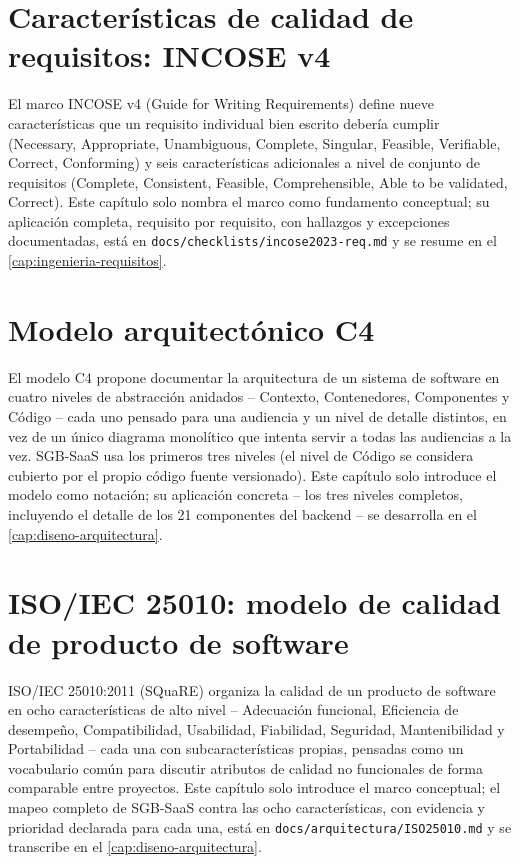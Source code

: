 \section{Características de calidad de requisitos: INCOSE v4}
\label{sec:mt-incose}

El marco INCOSE v4 (Guide for Writing Requirements) define nueve
características que un requisito individual bien escrito debería
cumplir (Necessary, Appropriate, Unambiguous, Complete, Singular,
Feasible, Verifiable, Correct, Conforming) y seis características
adicionales a nivel de conjunto de requisitos (Complete, Consistent,
Feasible, Comprehensible, Able to be validated, Correct). Este capítulo
solo nombra el marco como fundamento conceptual; su aplicación completa,
requisito por requisito, con hallazgos y excepciones documentadas, está
en \texttt{docs/checklists/incose2023-req.md} y se resume en el
\autoref{cap:ingenieria-requisitos}.

\section{Modelo arquitectónico C4}
\label{sec:mt-c4}

El modelo C4 \citep{brown2023c4model} propone documentar la arquitectura
de un sistema de software en cuatro niveles de abstracción anidados --
Contexto, Contenedores, Componentes y Código -- cada uno pensado para una
audiencia y un nivel de detalle distintos, en vez de un único diagrama
monolítico que intenta servir a todas las audiencias a la vez. SGB-SaaS
usa los primeros tres niveles (el nivel de Código se considera cubierto
por el propio código fuente versionado). Este capítulo solo introduce el
modelo como notación; su aplicación concreta -- los tres niveles
completos, incluyendo el detalle de los 21 componentes del backend -- se
desarrolla en el \autoref{cap:diseno-arquitectura}.

\section{ISO/IEC 25010: modelo de calidad de producto de software}
\label{sec:mt-25010}

ISO/IEC 25010:2011 (SQuaRE) organiza la calidad de un producto de
software en ocho características de alto nivel -- Adecuación funcional,
Eficiencia de desempeño, Compatibilidad, Usabilidad, Fiabilidad,
Seguridad, Mantenibilidad y Portabilidad -- cada una con subcaracterísticas
propias, pensadas como un vocabulario común para discutir atributos de
calidad no funcionales de forma comparable entre proyectos. Este
capítulo solo introduce el marco conceptual; el mapeo completo de
SGB-SaaS contra las ocho características, con evidencia y prioridad
declarada para cada una, está en \texttt{docs/arquitectura/ISO25010.md}
y se transcribe en el \autoref{cap:diseno-arquitectura}.

